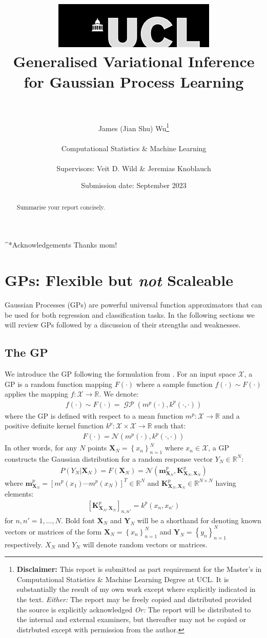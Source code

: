 \documentclass{article}
\title{  	{ \includegraphics[scale=.5]{ucl_logo.png}}\\
{{\Huge Generalised Variational Inference for Gaussian Process Learning}}\\
{\large }\\
		}
\date{Submission date: September 2023}
\author{James (Jian Shu) Wu\thanks{
{\bf Disclaimer:}
This report is submitted as part requirement for the Master's in Computational Statistics \& Machine Learning Degree at UCL. It is
substantially the result of my own work except where explicitly indicated in the text.
\newline  %
\emph{Either: }The report may be freely copied and distributed provided the source is explicitly acknowledged
\newline  %
\emph{Or: }The report will be distributed to the internal and external examiners, but thereafter may not be copied or distrbuted except with permission from the author.}
\\ \\
Computational Statistics \& Machine Learning\\ \\
Supervisors: Veit D. Wild \& Jeremias Knoblauch}
\newcommand{\GP}{\operatorname{\mathcal{GP}}}
\numberwithin{equation}{section}
\begin{document}
\onehalfspacing
\maketitle
{}
\newpage
\setcounter{page}{1}
\sectioN^*{Acknowledgements}
Thanks mom!
\newpage

\begin{abstract}
Summarise your report concisely.
\end{abstract}
\newpage
\tableofcontents
\newpage
{}
\setcounter{page}{1}
\section{GPs: Flexible but \textit{not} Scaleable}
Gaussian Processes (GPs) are powerful universal function approximators that can be used for both regression and classification tasks. In the following sections we will review GPs followed by a discussion of their strengths and weaknesses.
\subsection{The GP}\label{section:the-gp}
We introduce the GP following the formulation from \cite{rasmussen2003gaussian}. For an input space $\mathcal{X}$, a GP is a random function mapping $F(\cdot)$ where a sample function $f(\cdot) \sim F(\cdot)$ applies the mapping $f: \mathcal{X} \rightarrow \mathbb{R}$. We denote:
\begin{align}
    f(\cdot) \sim F(\cdot) = \GP\left(m^p(\cdot), k^p(\cdot, \cdot)\right)
    \label{gp}
\end{align}
where the GP is defined with respect to a mean function $m^p: \mathcal{X} \rightarrow \mathbb{R}$ and a positive definite kernel function $k^p: \mathcal{X} \times \mathcal{X} \rightarrow \mathbb{R}$ such that:
\begin{align}
    F(\cdot) = \mathcal{N}(m^p(\cdot), k^p(\cdot, \cdot))
    \label{gp-normal}
\end{align}
In other words, for any $N$ points $\mathbf{X}_N = \left\{ x_n\right\}_{n=1}^N$ where $x_n \in \mathcal{X}$, a GP constructs the Gaussian distribution for a random response vector $Y_N \in \mathbb{R}^{N}$:
\begin{align}
    \label{gp-vector}
    P\left(Y_N \vert \mathbf{X}_N\right) = F\left( \mathbf{X}_N\right) = \mathcal{N}\left(\mathbf{m}^p_{\mathbf{X}_N}, \mathbf{K}^{p}_{\mathbf{X}_N, \mathbf{X}_N}\right)
\end{align}
where $\mathbf{m}^p_{\mathbf{X}_N} = \left[ m^p(x_1) \cdots m^p(x_N)\right]^T \in \mathbb{R}^N$ and $\mathbf{K}^p_{\mathbf{X}_N, \mathbf{X}_N} \in \mathbb{R}^{N \times N}$ having elements:
\begin{align}
    \left[\mathbf{K}^p_{\mathbf{X}_N, \mathbf{X}_N}\right]_{n, n'} = k^p(x_n, x_{n'})
\end{align}
for $n, n'=1,\dots, N$. Bold font $\mathbf{X}_N$ and $\mathbf{Y}_N$ will be a shorthand for denoting known vectors or matrices of the form $\mathbf{X}_N = \left\{ x_n\right\}_{n=1}^N$ and $\mathbf{Y}_N = \left\{ y_n\right\}_{n=1}^N$ respectively. $X_N$ and $Y_N$ will denote random vectors or matrices.
\end{document}
